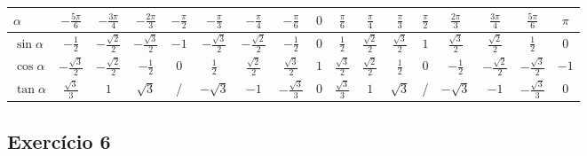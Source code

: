 \begin{enumerate}
  \begin{center}
  \begin{tabular}{| l | c | c | c | c | c | c | c | c | c | c | c | c | c | c | c | c |}
    \hline
    $\alpha$ &
    $-\frac{5\pi}{6}$ &
    $-\frac{3\pi}{4}$ &
    $-\frac{2\pi}{3}$ &
    $-\frac{\pi}{2}$ &
    $-\frac{\pi}{3}$ &
    $-\frac{\pi}{4}$ &
    $-\frac{\pi}{6}$ &
    $0$ &
    $\frac{\pi}{6}$ &
    $\frac{\pi}{4}$ &
    $\frac{\pi}{3}$ &
    $\frac{\pi}{2}$ &
    $\frac{2\pi}{3}$ &
    $\frac{3\pi}{4}$ &
    $\frac{5\pi}{6}$ &
    $\pi$ \\
    \hline
    $\sin \alpha$ & 
    $-\frac{1}{2}$ &
    $-\frac{\sqrt{2}}{2}$ &
    $-\frac{\sqrt{3}}{2}$ &
    $-1$ &
    $-\frac{\sqrt{3}}{2}$ &
    $-\frac{\sqrt{2}}{2}$ &
    $-\frac{1}{2}$ &
    $0$ &
    $\frac{1}{2}$ &
    $\frac{\sqrt{2}}{2}$ &
    $\frac{\sqrt{3}}{2}$ &
    $1$ &
    $\frac{\sqrt{3}}{2}$ &
    $\frac{\sqrt{2}}{2}$ &
    $\frac{1}{2}$ &
    $0$
    \\
    \hline
    $\cos \alpha$ &
    $-\frac{\sqrt{3}}{2}$ &
    $-\frac{\sqrt{2}}{2}$ &
    $-\frac{1}{2}$ &
    $0$ &
    $\frac{1}{2}$ &
    $\frac{\sqrt{2}}{2}$ &
    $\frac{\sqrt{3}}{2}$ &
    $1$ &
    $\frac{\sqrt{3}}{2}$ &
    $\frac{\sqrt{2}}{2}$ &
    $\frac{1}{2}$ &
    $0$ &
    $-\frac{1}{2}$ &
    $-\frac{\sqrt{2}}{2}$ &
    $-\frac{\sqrt{3}}{2}$ &
    $-1$
    \\
    \hline
    $\tan \alpha$ & 
    $\frac{\sqrt{3}}{3}$ &
    $1$ &
    $\sqrt{3}$ &
    / &
    $-\sqrt{3}$ &
    $-1$ &
    $-\frac{\sqrt{3}}{3}$ &
    $0$ &
    $\frac{\sqrt{3}}{3}$ &
    $1$ &
    $\sqrt{3}$ &
    / &
    $-\sqrt{3}$ &
    $-1$ &
    $-\frac{\sqrt{3}}{3}$ &
    $0$
    \\
    \hline
  \end{tabular}
  \end{center}
  
\end{enumerate}

\subsection{Exercício 6}

